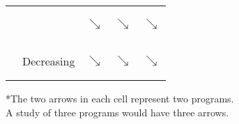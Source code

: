 \begin{table}[h!]
\begin{tabular}{cllll}
\multicolumn{1}{c}{} & \multicolumn{1}{c|}{} & \multicolumn{1}{c|}{$\searrow$}           & \multicolumn{1}{c|}{$\searrow$}       & \multicolumn{1}{c|}{\begin{rotate}{30}$\searrow$\end{rotate}}          \\ 
\multicolumn{1}{c}{} & \multicolumn{1}{c|}{Decreasing} & \multicolumn{1}{c|}{\begin{rotate}{30}$\searrow$\end{rotate}}           & \multicolumn{1}{c|}{$\searrow$}       & \multicolumn{1}{c|}{$\searrow$}          \\ \cline{3-5} 
\end{tabular}

\raggedleft

*The two arrows in each cell represent two programs.\\A study of three programs would have three arrows. 
\end{table}
